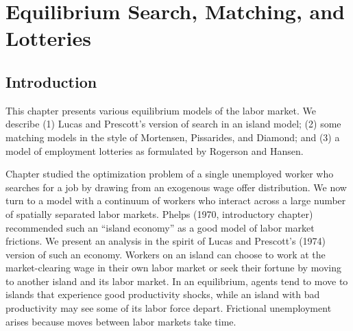 

%


%
%
\def\lege{\raise.3ex\hbox{$>$\kern-.75em\lower1ex\hbox{$<$}}}

\chapter{Equilibrium Search, Matching, and Lotteries\label{search2}}

\section{Introduction}

   This chapter presents various equilibrium models of
the labor market. %
We
describe (1) Lucas and Prescott's version of search in an island model; (2) some matching
models in the style of Mortensen, Pissarides, and Diamond; and (3)
a model of employment lotteries as formulated by Rogerson and Hansen.


Chapter  studied the optimization problem of a single
unemployed worker who searches for a job by drawing from an
exogenous wage offer distribution.  We now turn to a model with a
continuum of workers who interact across a large number of
spatially separated labor markets. Phelps (1970, introductory
chapter)
%
recommended  such an ``island economy'' as a good model of labor market frictions.
%
We present an analysis in the spirit of  Lucas and Prescott's (1974) version of such an economy.
%
Workers  on an island can choose to work at
the market-clearing wage in their own labor market or seek their
fortune by moving to another island and its labor market. In an equilibrium,
agents tend to move to islands that experience good productivity shocks,
while an island with bad productivity may see some of its labor force depart.
Frictional unemployment arises because moves between labor markets take
time.

